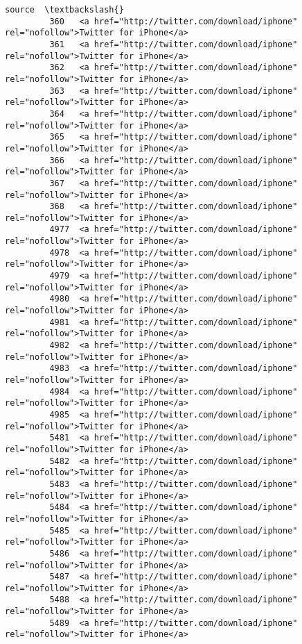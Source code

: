 \documentclass[11pt]{article}
\begin{document}
\begin{Verbatim}[commandchars=\\\{\}]
                                                                                           source  \textbackslash{}
         360   <a href="http://twitter.com/download/iphone" rel="nofollow">Twitter for iPhone</a>   
         361   <a href="http://twitter.com/download/iphone" rel="nofollow">Twitter for iPhone</a>   
         362   <a href="http://twitter.com/download/iphone" rel="nofollow">Twitter for iPhone</a>   
         363   <a href="http://twitter.com/download/iphone" rel="nofollow">Twitter for iPhone</a>   
         364   <a href="http://twitter.com/download/iphone" rel="nofollow">Twitter for iPhone</a>   
         365   <a href="http://twitter.com/download/iphone" rel="nofollow">Twitter for iPhone</a>   
         366   <a href="http://twitter.com/download/iphone" rel="nofollow">Twitter for iPhone</a>   
         367   <a href="http://twitter.com/download/iphone" rel="nofollow">Twitter for iPhone</a>   
         368   <a href="http://twitter.com/download/iphone" rel="nofollow">Twitter for iPhone</a>   
         4977  <a href="http://twitter.com/download/iphone" rel="nofollow">Twitter for iPhone</a>   
         4978  <a href="http://twitter.com/download/iphone" rel="nofollow">Twitter for iPhone</a>   
         4979  <a href="http://twitter.com/download/iphone" rel="nofollow">Twitter for iPhone</a>   
         4980  <a href="http://twitter.com/download/iphone" rel="nofollow">Twitter for iPhone</a>   
         4981  <a href="http://twitter.com/download/iphone" rel="nofollow">Twitter for iPhone</a>   
         4982  <a href="http://twitter.com/download/iphone" rel="nofollow">Twitter for iPhone</a>   
         4983  <a href="http://twitter.com/download/iphone" rel="nofollow">Twitter for iPhone</a>   
         4984  <a href="http://twitter.com/download/iphone" rel="nofollow">Twitter for iPhone</a>   
         4985  <a href="http://twitter.com/download/iphone" rel="nofollow">Twitter for iPhone</a>   
         5481  <a href="http://twitter.com/download/iphone" rel="nofollow">Twitter for iPhone</a>   
         5482  <a href="http://twitter.com/download/iphone" rel="nofollow">Twitter for iPhone</a>   
         5483  <a href="http://twitter.com/download/iphone" rel="nofollow">Twitter for iPhone</a>   
         5484  <a href="http://twitter.com/download/iphone" rel="nofollow">Twitter for iPhone</a>   
         5485  <a href="http://twitter.com/download/iphone" rel="nofollow">Twitter for iPhone</a>   
         5486  <a href="http://twitter.com/download/iphone" rel="nofollow">Twitter for iPhone</a>   
         5487  <a href="http://twitter.com/download/iphone" rel="nofollow">Twitter for iPhone</a>   
         5488  <a href="http://twitter.com/download/iphone" rel="nofollow">Twitter for iPhone</a>   
         5489  <a href="http://twitter.com/download/iphone" rel="nofollow">Twitter for iPhone</a>   
         

\end{Verbatim}
\end{document}
